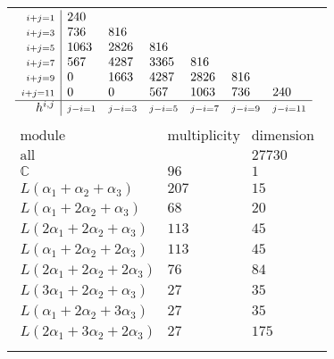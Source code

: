 \documentclass[crop,border=2mm]{standalone}
\begin{document}
\begin{tabular}{l}
$\displaystyle
\begin{array}{r|l l l l l l}
	{\scriptstyle i+j=1}&240&&&&&\\
	{\scriptstyle i+j=3}&736&816&&&&\\
	{\scriptstyle i+j=5}&1063&2826&816&&&\\
	{\scriptstyle i+j=7}&567&4287&3365&816&&\\
	{\scriptstyle i+j=9}&0&1663&4287&2826&816&\\
	{\scriptstyle i+j=11}&0&0&567&1063&736&240\\
	\hline h^{i,j}&{\scriptstyle j-i=1}&{\scriptstyle j-i=3}&{\scriptstyle j-i=5}&{\scriptstyle j-i=7}&{\scriptstyle j-i=9}&{\scriptstyle j-i=11}
\end{array}
$ \\ \\


$\displaystyle
\begin{array}{rll}
	\text{module}&\text{multiplicity}&\text{dimension} \\ \hline \text{all}&&27730 \\
	\mathbb{C}&96&1\\
	L\left(\alpha_{1}+\alpha_{2}+\alpha_{3}\right)&207&15\\
	L\left(\alpha_{1}+ 2\alpha_{2}+\alpha_{3}\right)&68&20\\
	L\left( 2\alpha_{1}+ 2\alpha_{2}+\alpha_{3}\right)&113&45\\
	L\left(\alpha_{1}+ 2\alpha_{2}+ 2\alpha_{3}\right)&113&45\\
	L\left( 2\alpha_{1}+ 2\alpha_{2}+ 2\alpha_{3}\right)&76&84\\
	L\left( 3\alpha_{1}+ 2\alpha_{2}+\alpha_{3}\right)&27&35\\
	L\left(\alpha_{1}+ 2\alpha_{2}+ 3\alpha_{3}\right)&27&35\\
	L\left( 2\alpha_{1}+ 3\alpha_{2}+ 2\alpha_{3}\right)&27&175
\end{array}
$ \\ \\

\end{tabular}
\end{document}
